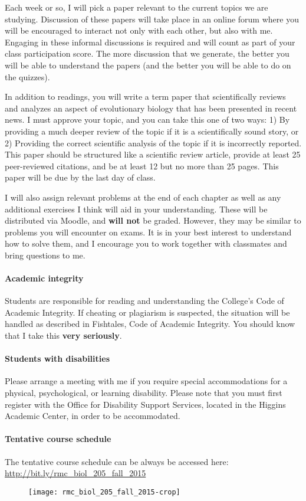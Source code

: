 \documentclass{article}
\begin{document}
Each week or so, I will pick a paper relevant to the current topics we
are
studying. Discussion of these papers will take place in an online forum where
you will be encouraged to interact not only with each other, but also with me.
Engaging in these informal discussions is required and will count as part of
your class participation score. The more discussion that we generate, the
better you will be able to understand the papers (and the better you will be
able to do on the quizzes).

In addition to readings, you will write a term paper that scientifically
reviews and analyzes an aspect of evolutionary biology that has been presented
in recent news. I must approve your topic, and you can take this one of two
ways: 1) By providing a much deeper review of the topic if it is a
scientifically sound story, or 2) Providing the correct scientific analysis of
the topic if it is incorrectly reported. This paper should be structured like
a scientific review article, provide at least 25 peer-reviewed citations, and
be at least 12 but no more than 25 pages.  This paper will be due by the last
day of class.

I will also assign relevant problems at the end of each chapter as well as any
additional exercises I think will aid in your understanding. These will be
distributed via Moodle, and \textbf{will not} be graded.  However, they may be
similar to problems you will encounter on exams.  It is in your best interest
to understand how to solve them, and I encourage you to work together with
classmates and bring questions to me.


\paragraph{Academic integrity}
Students are responsible for reading and
understanding the College's Code of Academic Integrity.  If cheating or
plagiarism is suspected, the situation will be handled as described in
Fishtales, Code of Academic Integrity. You should know that I take this \textbf
{very seriously}.

\paragraph{Students with disabilities}
Please arrange a meeting with me if you
require special accommodations for a physical, psychological, or learning
disability.  Please note that you must first register with the Office for
Disability Support Services, located in the Higgins Academic Center, in order
to be accommodated.

\paragraph{Tentative course schedule}
The tentative course schedule can be always be accessed here: \\
\url{http://bit.ly/rmc_biol_205_fall_2015}

\begin{figure}[h]
\centering
\texttt{[image: rmc\_biol\_205\_fall\_2015-crop]}	
\end{figure}
\end{document}
